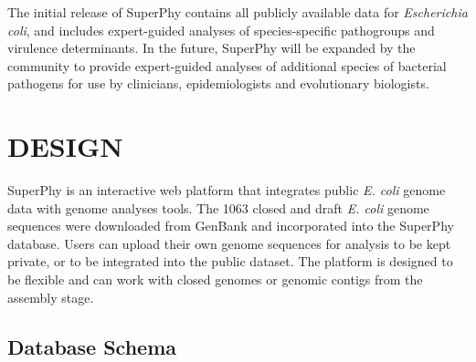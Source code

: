 \documentclass[a4paper,twoside]{article}
\begin{document}
{The initial release of SuperPhy contains all publicly available data for \textit{Escherichia coli}, and includes expert-guided analyses of species-specific pathogroups and virulence determinants. In the future, SuperPhy will be expanded by the community to provide expert-guided analyses of additional species of bacterial pathogens for use by clinicians, epidemiologists and evolutionary biologists.

\section{\uppercase{Design}}
\label{sec:design}

\noindent SuperPhy is an interactive web platform that integrates public \textit{E. coli} genome data with genome analyses tools. The 1063 closed and draft \textit{E. coli} genome sequences were downloaded from GenBank and incorporated into the SuperPhy database. Users can upload their own genome sequences for analysis to be kept private, or to be integrated into the public dataset. The platform is designed to be flexible and can work with closed genomes or genomic contigs from the assembly stage. 

\subsection{Database Schema}

}
\end{document}
